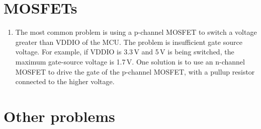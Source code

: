\section{MOSFETs}

\begin{enumerate}
\item The most common problem is using a p-channel MOSFET to switch a
  voltage greater than VDDIO of the MCU.  The problem is insufficient
  gate source voltage.  For example, if VDDIO is 3.3\,V and 5\,V is
  being switched, the maximum gate-source voltage is 1.7\,V.  One
  solution is to use an n-channel MOSFET to drive the gate of the
  p-channel MOSFET, with a pullup resistor connected to the higher
  voltage.
\end{enumerate}


\section{Other problems}
\label{faq}

